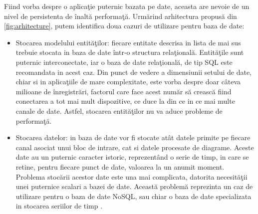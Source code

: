 Fiind vorba despre o aplicaţie puternic bazata pe date, aceasta are nevoie de un nivel de persistenta de înaltă performaţă. 
Urmărind arhitectura propusă din \cref{fig:arhitecture}, putem identifica doua cazuri de utilizare pentru baza de date: 
\begin{itemize}
	\item Stocarea modelului entităţilor: fiecare entitate descrisa in lista de mai sus trebuie stocata in baza de date într-o structura relaţională. Entităţile sunt puternic interconectate, iar o baza de date relaţională, de tip SQL este recomandata in acest caz. 
	Din punct de vedere a dimensiunii setului de date, chiar si in aplicaţiile de mare complexitate, este vorba despre doar câteva milioane de înregistrări, factorul care face acest număr să crească fiind conectarea a tot mai mult dispozitive, ce duce la din ce in ce mai multe canale de date. Astfel, stocarea entităţilor nu va aduce probleme de performaţă. 
	\item Stocarea datelor: in baza de date vor fi stocate atât datele primite pe fiecare canal asociat unui bloc de intrare, cat si datele procesate de diagrame. Aceste date au un puternic caracter istoric, reprezentând o serie de timp, in care se retine, pentru fiecare punct de date, valoarea la un anumit moment. Problema stocării acestor date este una mai complicata, datorita necesităţii unei puternice scalari a bazei de date. Această problemă reprezinta un caz de utilizare pentru o baza de date NoSQL, sau chiar o baza de date specializata in stocarea seriilor de timp \autocite{openTSDB}.  
\end{itemize}

